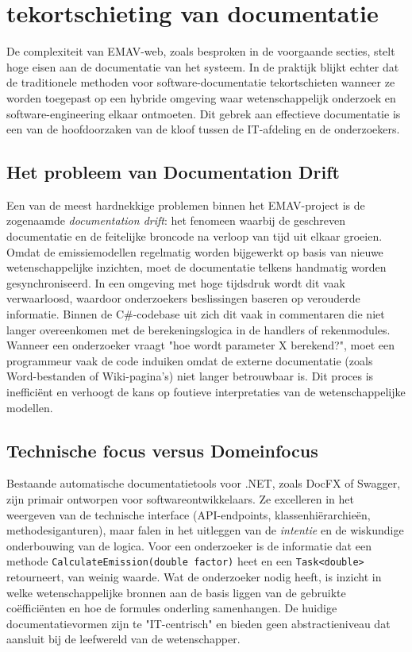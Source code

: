 \chapter{tekortschieting van documentatie}
De complexiteit van EMAV-web, zoals besproken in de voorgaande secties, stelt hoge eisen aan de documentatie van het systeem. In de praktijk blijkt echter dat de traditionele methoden voor software-documentatie tekortschieten wanneer ze worden toegepast op een hybride omgeving waar wetenschappelijk onderzoek en software-engineering elkaar ontmoeten. Dit gebrek aan effectieve documentatie is een van de hoofdoorzaken van de kloof tussen de IT-afdeling en de onderzoekers.
\section{Het probleem van \textquotedbl Documentation Drift\textquotedbl}
Een van de meest hardnekkige problemen binnen het EMAV-project is de zogenaamde \textit{documentation drift}: het fenomeen waarbij de geschreven documentatie en de feitelijke broncode na verloop van tijd uit elkaar groeien. Omdat de emissiemodellen regelmatig worden bijgewerkt op basis van nieuwe wetenschappelijke inzichten, moet de documentatie telkens handmatig worden gesynchroniseerd. In een omgeving met hoge tijdsdruk wordt dit vaak verwaarloosd, waardoor onderzoekers beslissingen baseren op verouderde informatie.
Binnen de C\#-codebase uit zich dit vaak in commentaren die niet langer overeenkomen met de berekeningslogica in de handlers of rekenmodules. Wanneer een onderzoeker vraagt "hoe wordt parameter X berekend?", moet een programmeur vaak de code induiken omdat de externe documentatie (zoals Word-bestanden of Wiki-pagina's) niet langer betrouwbaar is. Dit proces is inefficiënt en verhoogt de kans op foutieve interpretaties van de wetenschappelijke modellen.
\section{Technische focus versus Domeinfocus}
Bestaande automatische documentatietools voor .NET, zoals DocFX of Swagger, zijn primair ontworpen voor softwareontwikkelaars. Ze excelleren in het weergeven van de technische interface (API-endpoints, klassenhiërarchieën, methodesiganturen), maar falen in het uitleggen van de \textit{intentie} en de wiskundige onderbouwing van de logica.
Voor een onderzoeker is de informatie dat een methode \texttt{CalculateEmission(double factor)} heet en een \texttt{Task<double>} retourneert, van weinig waarde. Wat de onderzoeker nodig heeft, is inzicht in welke wetenschappelijke bronnen aan de basis liggen van de gebruikte coëfficiënten en hoe de formules onderling samenhangen. De huidige documentatievormen zijn te "IT-centrisch" en bieden geen abstractieniveau dat aansluit bij de leefwereld van de wetenschapper.
